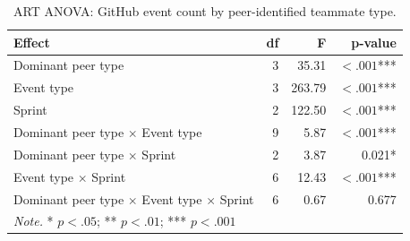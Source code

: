 \begin{table}[ht]
\centering
\footnotesize
\caption{ART ANOVA: GitHub event count by peer-identified teammate type.}
\label{tab:gh-anova-dominant}
\begin{tabular}{l r r r}
\toprule
\textbf{Effect} & \textbf{df} & \textbf{F} & \textbf{p-value} \\
\midrule
Dominant peer type & 3 & 35.31 & $< .001$*** \\
Event type & 3 & 263.79 & $< .001$*** \\
Sprint & 2 & 122.50 & $< .001$*** \\
Dominant peer type $\times$ Event type & 9 & 5.87 & $< .001$*** \\
Dominant peer type $\times$ Sprint & 2 & 3.87 & 0.021* \\
Event type $\times$ Sprint & 6 & 12.43 & $< .001$*** \\
Dominant peer type $\times$ Event type $\times$ Sprint & 6 & 0.67 & 0.677 \\
\midrule
\multicolumn{4}{l}{\textit{Note.} * $p < .05$; ** $p < .01$; *** $p < .001$} \\
\bottomrule
\end{tabular}
\end{table}
